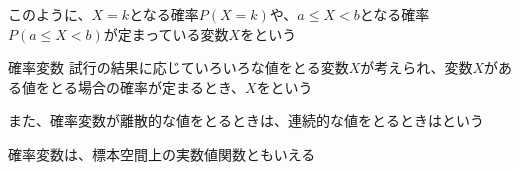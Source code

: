 \documentclass[../../../topic_probability-statistics]{subfiles}
\begin{document}
このように、$X=k$となる確率$P(X=k)$や、$a \leq X < b$となる確率$P(a \leq X < b)$が定まっている変数$X$をという

\begin{definition}{確率変数}
  試行の結果に応じていろいろな値をとる変数$X$が考えられ、変数$X$がある値をとる場合の確率が定まるとき、$X$をという

  また、確率変数が離散的な値をとるときは、連続的な値をとるときはという
\end{definition}

確率変数は、標本空間上の実数値関数ともいえる
\end{document}
